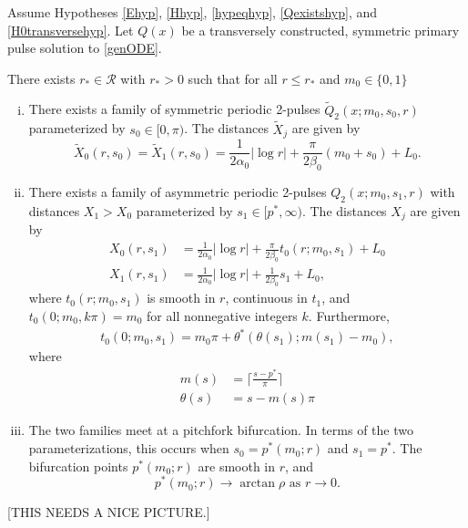 \documentclass[thesis.tex]{subfiles}
\begin{document}
\begin{theorem}\label{2pulsebifurcation}
Assume Hypotheses \ref{Ehyp}, \ref{Hhyp}, \ref{hypeqhyp}, \ref{Qexistshyp}, and \ref{H0transversehyp}. Let $Q(x)$ be a transversely constructed, symmetric primary pulse solution to \eqref{genODE}.

There exists $r_* \in \mathcal{R}$ with $r_* > 0$ such that for all $r \leq r_*$ and $m_0 \in \{0, 1\}$
\begin{enumerate}[(i)]
	\item There exists a family of symmetric periodic 2-pulses $\tilde{Q}_2(x; m_0, s_0, r)$ parameterized by $s_0 \in [0, \pi)$. The distances $\tilde{X}_j$ are given by
	\begin{equation}\label{2psymmdist}
		\tilde{X}_0(r, s_0) = \tilde{X}_1(r, s_0) = \frac{1}{2 \alpha_0} |\log r| + \frac{\pi}{2\beta_0} (m_0 + s_0) + L_0.
	\end{equation}
	\item There exists a family of asymmetric periodic 2-pulses $Q_2(x; m_0, s_1, r)$ with distances $X_1 > X_0$ parameterized by $s_1 \in [p^*, \infty)$. The distances $X_j$ are given by
	\begin{equation}\label{2pasymmdist}
	\begin{aligned}
		X_0(r, s_1) &= \frac{1}{2 \alpha_0} |\log r| + \frac{\pi}{2\beta_0} t_0(r; m_0, s_1) + L_0 \\
		X_1(r, s_1) &= \frac{1}{2 \alpha_0} |\log r| + \frac{1}{2\beta_0} s_1 + L_0, 
	\end{aligned}
	\end{equation}
	where $t_0(r; m_0, s_1)$ is smooth in $r$, continuous in $t_1$, and $t_0(0; m_0, k \pi) = m_0$ for all nonnegative integers $k$. Furthermore,
	\begin{align}\label{deft0}
	t_0(0; m_0, s_1) = m_0 \pi + \theta^*(\theta(s_1); m(s_1) - m_0),
	\end{align}
	where
	\begin{equation*}
	\begin{aligned}
	m(s) &= \lceil \frac{s - p^*}{\pi} \rceil \\
	\theta(s) &= s - m(s) \pi
	\end{aligned}
	\end{equation*}

	\item The two families meet at a pitchfork bifurcation. In terms of the two parameterizations, this occurs when $s_0 = p^*(m_0; r)$ and $s_1 = p^*$. The bifurcation points $p^*(m_0; r)$ are smooth in $r$, and
	\[
	p^*(m_0; r) \rightarrow \arctan \rho \text{ as }r \rightarrow 0.
	\]
\end{enumerate}
\end{theorem}
[THIS NEEDS A NICE PICTURE.]
\end{document}
